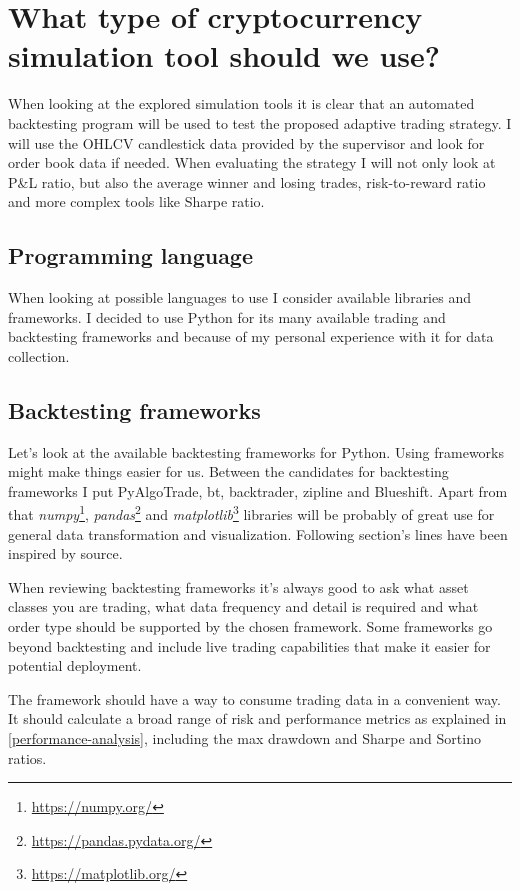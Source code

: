 \section{What type of cryptocurrency simulation tool should we use?}
When looking at the explored simulation tools it is clear that an automated backtesting program will be used to test the proposed adaptive trading strategy. I will use the OHLCV candlestick data provided by the supervisor and look for order book data if needed. When evaluating the strategy I will not only look at P\&L ratio, but also the average winner and losing trades, risk-to-reward ratio and more complex tools like Sharpe ratio.

\subsection*{Programming language}
When looking at possible languages to use I consider available libraries and frameworks. I decided to use Python for its many available trading and backtesting frameworks and because of my personal experience with it for data collection.

\subsection*{Backtesting frameworks}
Let's look at the available backtesting frameworks for Python. Using frameworks might make things easier for us. Between the candidates for backtesting frameworks I put PyAlgoTrade, bt, backtrader, zipline and Blueshift. Apart from that \emph{numpy}\footnote{\url{https://numpy.org/}}, \emph{pandas}\footnote{\url{https://pandas.pydata.org/}} and \emph{matplotlib}\footnote{\url{https://matplotlib.org/}} libraries will be probably of great use for general data transformation and visualization. Following section's lines have been inspired by \cite{python-backtesting-frameworks} source.

When reviewing backtesting frameworks it's always good to ask what asset classes you are trading, what data frequency and detail is required and what order type should be supported by the chosen framework. Some frameworks go beyond backtesting and include live trading capabilities that make it easier for potential deployment.

The framework should have a way to consume trading data in a convenient way. It should calculate a broad range of risk and performance metrics as explained in \ref{performance-analysis}, including the max drawdown and Sharpe and Sortino ratios.

